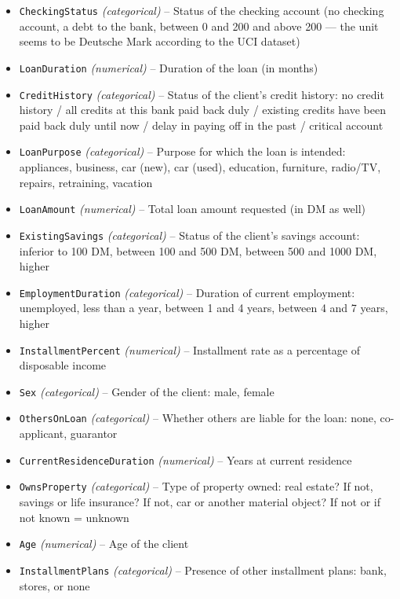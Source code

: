 \documentclass[12pt]{report}
\begin{document}
\begin{itemize}
    \item \texttt{CheckingStatus} \textit{(categorical)} – Status of the checking account (no checking account, a debt to the bank, between 0 and 200 and above 200 — the unit seems to be Deutsche Mark according to the UCI dataset)
    \item \texttt{LoanDuration} \textit{(numerical)} – Duration of the loan (in months)
    \item \texttt{CreditHistory} \textit{(categorical)} – Status of the client's credit history: no credit history / all credits at this bank paid back duly / existing credits have been paid back duly until now / delay in paying off in the past / critical account
    \item \texttt{LoanPurpose} \textit{(categorical)} – Purpose for which the loan is intended: appliances, business, car (new), car (used), education, furniture, radio/TV, repairs, retraining, vacation
    \item \texttt{LoanAmount} \textit{(numerical)} – Total loan amount requested (in DM as well)
    \item \texttt{ExistingSavings} \textit{(categorical)} – Status of the client's savings account: inferior to 100 DM, between 100 and 500 DM, between 500 and 1000 DM, higher
    \item \texttt{EmploymentDuration} \textit{(categorical)} – Duration of current employment: unemployed, less than a year, between 1 and 4 years, between 4 and 7 years, higher
    \item \texttt{InstallmentPercent} \textit{(numerical)} – Installment rate as a percentage of disposable income
    \item \texttt{Sex} \textit{(categorical)} – Gender of the client: male, female
    \item \texttt{OthersOnLoan} \textit{(categorical)} – Whether others are liable for the loan: none, co-applicant, guarantor
    \item \texttt{CurrentResidenceDuration} \textit{(numerical)} – Years at current residence
    \item \texttt{OwnsProperty} \textit{(categorical)} – Type of property owned: real estate? If not, savings or life insurance? If not, car or another material object? If not or if not known = unknown
    \item \texttt{Age} \textit{(numerical)} – Age of the client
    \item \texttt{InstallmentPlans} \textit{(categorical)} – Presence of other installment plans: bank, stores, or none

\end{itemize}
\end{document}
